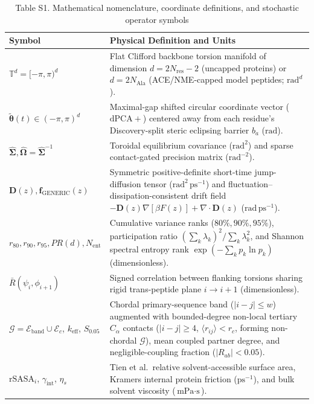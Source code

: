 \documentclass[10pt,letterpaper]{article}
\begin{document}
\begin{table}[!htbp]
\centering
\caption*{Table S1. Mathematical nomenclature, coordinate definitions, and stochastic operator symbols}
\footnotesize
\renewcommand{\arraystretch}{1.14}
\begin{tabular}{@{}p{} p{}@{}}
\toprule[1.1pt]
\textbf{Symbol} & \textbf{Physical Definition and Units} \\
\midrule[0.6pt]
$\mathbb{T}^d = [-\pi,\pi)^d$ & Flat Clifford backbone torsion manifold of dimension $d = 2N_{\mathrm{res}}-2$ (uncapped proteins) or $d = 2N_{\mathrm{Ala}}$ (ACE/NME-capped model peptides; $\text{rad}^d$). \\
$\tilde{\bm{\theta}}(t) \in (-\pi,\pi)^d$ & Maximal-gap shifted circular coordinate vector ($\mathrm{dPCA}+$) centered away from each residue's Discovery-split steric eclipsing barrier $b_a$ ($\text{rad}$). \\
$\hat{\bm{\Sigma}}, \hat{\bm{\Omega}} = \hat{\bm{\Sigma}}^{-1}$ & Toroidal equilibrium covariance ($\text{rad}^2$) and sparse contact-gated precision matrix ($\text{rad}^{-2}$). \\
$\mathbf{D}(z), \mathbf{f}_{\mathrm{GENERIC}}(z)$ & Symmetric positive-definite short-time jump-diffusion tensor ($\text{rad}^2\,\text{ps}^{-1}$) and fluctuation--dissipation-consistent drift field $-\mathbf{D}(z)\nabla[\beta F(z)] + \nabla\!\cdot\!\mathbf{D}(z)$ ($\text{rad}\,\text{ps}^{-1}$). \\
$r_{80}, r_{90}, r_{95}, PR(d), N_{\mathrm{ent}}$ & Cumulative variance ranks ($80\%, 90\%, 95\%$), participation ratio $(\sum_k\lambda_k)^2/\sum_k\lambda_k^2$, and Shannon spectral entropy rank $\exp(-\sum_k p_k\ln p_k)$ (dimensionless). \\
$\bar{R}(\psi_i,\phi_{i+1})$ & Signed correlation between flanking torsions sharing rigid trans-peptide plane $i \to i+1$ (dimensionless). \\
$\mathcal{G} = \mathcal{E}_{\mathrm{band}} \cup \mathcal{E}_c$, $k_{\mathrm{eff}}$, $S_{0.05}$ & Chordal primary-sequence band ($|i-j|\le w$) augmented with bounded-degree non-local tertiary $C_\alpha$ contacts ($|i-j|\ge 4$, $\langle r_{ij}\rangle < r_c$, forming non-chordal $\mathcal{G}$), mean coupled partner degree, and negligible-coupling fraction ($|R_{ab}| < 0.05$). \\
$\mathrm{rSASA}_i$, $\gamma_{\mathrm{int}}$, $\eta_s$ & Tien et al.\ relative solvent-accessible surface area, Kramers internal protein friction ($\text{ps}^{-1}$), and bulk solvent viscosity ($\text{mPa}\cdot\text{s}$). \\

\end{tabular}
\end{table}
\end{document}
